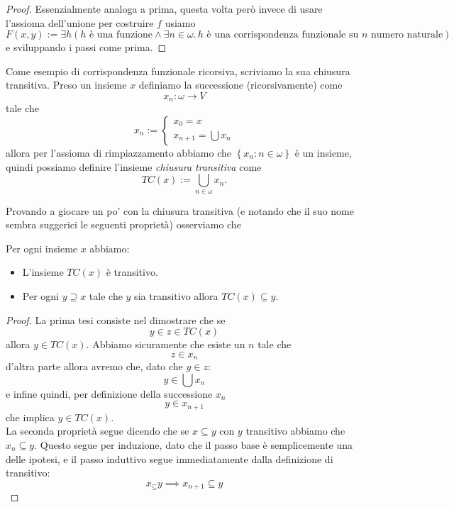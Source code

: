 \documentclass[11pt]{scrartcl}
\begin{document}
 	\begin{proof}
 		Essenzialmente analoga a prima, questa volta però invece di usare l'assioma dell'unione per costruire $f$ usiamo 
 		$$F(x,y):= \exists h \left(h \text{ è una funzione}\land \exists n\in \omega.\, h \text{ è una corrispondenza funzionale su $n$ numero naturale}\right)$$
 		e sviluppando i passi come prima.
 	\end{proof}
 	\begin{example}
 		Come esempio di corrispondenza funzionale ricorsiva, scriviamo la sua chiusura transitiva. Preso un insieme $x$ definiamo la successione (ricorsivamente) come
 		$$x_n:\omega\to V$$
 		tale che
 		$$x_n:=
 		\begin{cases}
 			x_0=x \\
 			x_{n+1}=\bigcup x_n
 		\end{cases}
 		$$
 		allora per l'assioma di rimpiazzamento abbiamo che $\left\{x_n :n\in \omega\right\}$ è un insieme, quindi possiamo definire l'insieme \textit{chiusura transitiva} come
 		$$TC(x):=\bigcup_{n\in \omega} x_n.$$
 	\end{example}
 	Provando a giocare un po' con la chiusura transitiva (e notando che il suo nome sembra suggerici le seguenti proprietà) osserviamo che
 	\begin{proposition}
 		Per ogni insieme $x$ abbiamo:
 		\begin{itemize}
 			\item L'insieme $TC(x)$ è transitivo.
 			\item Per ogni $y\supseteq x$ tale che $y$ sia transitivo allora $TC(x)\subseteq y$.
 		\end{itemize}
 	\end{proposition}
 	\begin{proof}
 		La prima tesi consiste nel dimostrare che se 
 		$$y\in z\in TC(x)$$
 		allora $y\in TC(x)$.
 		Abbiamo sicuramente che esiste un $n$ tale che
 		$$z\in x_n$$
 		d'altra parte allora avremo che, dato che $y\in z$:
 		$$y\in \bigcup x_n$$
 		e infine quindi, per definizione della successione $x_n$
 		$$y\in x_{n+1}$$
 		che implica $y\in TC(x)$. \\
 		La seconda proprietà segue dicendo che se $x\subseteq y$ con $y$ transitivo abbiamo che $x_n\subseteq y$. Questo segue per induzione, dato che il passo base è semplicemente una delle ipotesi, e il passo induttivo segue immediatamente dalla definizione di transitivo:
 		$$x_\subseteq y \implies x_{n+1}\subseteq y$$
 	\end{proof}
 	
\end{document}
